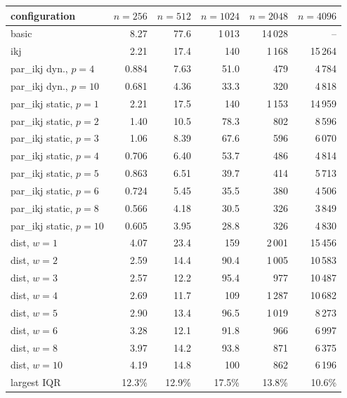 \begin{tabular}{lrrrrr}
\toprule
configuration & $n=256$ & $n=512$ & $n=1024$ & $n=2048$ & $n=4096$ \\
\midrule
basic & 8.27 & 77.6 & 1\,013 & 14\,028 & -- \\
ikj & 2.21 & 17.4 & 140 & 1\,168 & 15\,264 \\
par\_ikj dyn., $p=4$ & 0.884 & 7.63 & 51.0 & 479 & 4\,784 \\
par\_ikj dyn., $p=10$ & 0.681 & 4.36 & 33.3 & 320 & 4\,818 \\
\midrule
par\_ikj static, $p=1$ & 2.21 & 17.5 & 140 & 1\,153 & 14\,959 \\
par\_ikj static, $p=2$ & 1.40 & 10.5 & 78.3 & 802 & 8\,596 \\
par\_ikj static, $p=3$ & 1.06 & 8.39 & 67.6 & 596 & 6\,070 \\
par\_ikj static, $p=4$ & 0.706 & 6.40 & 53.7 & 486 & 4\,814 \\
par\_ikj static, $p=5$ & 0.863 & 6.51 & 39.7 & 414 & 5\,713 \\
par\_ikj static, $p=6$ & 0.724 & 5.45 & 35.5 & 380 & 4\,506 \\
par\_ikj static, $p=8$ & 0.566 & 4.18 & 30.5 & 326 & 3\,849 \\
par\_ikj static, $p=10$ & 0.605 & 3.95 & 28.8 & 326 & 4\,830 \\
\midrule
dist, $w=1$ & 4.07 & 23.4 & 159 & 2\,001 & 15\,456 \\
dist, $w=2$ & 2.59 & 14.4 & 90.4 & 1\,005 & 10\,583 \\
dist, $w=3$ & 2.57 & 12.2 & 95.4 & 977 & 10\,487 \\
dist, $w=4$ & 2.69 & 11.7 & 109 & 1\,287 & 10\,682 \\
dist, $w=5$ & 2.90 & 13.4 & 96.5 & 1\,019 & 8\,273 \\
dist, $w=6$ & 3.28 & 12.1 & 91.8 & 966 & 6\,997 \\
dist, $w=8$ & 3.97 & 14.2 & 93.8 & 871 & 6\,375 \\
dist, $w=10$ & 4.19 & 14.8 & 100 & 862 & 6\,196 \\
\midrule
largest IQR & 12.3\% & 12.9\% & 17.5\% & 13.8\% & 10.6\% \\
\bottomrule
\end{tabular}
\par{}
